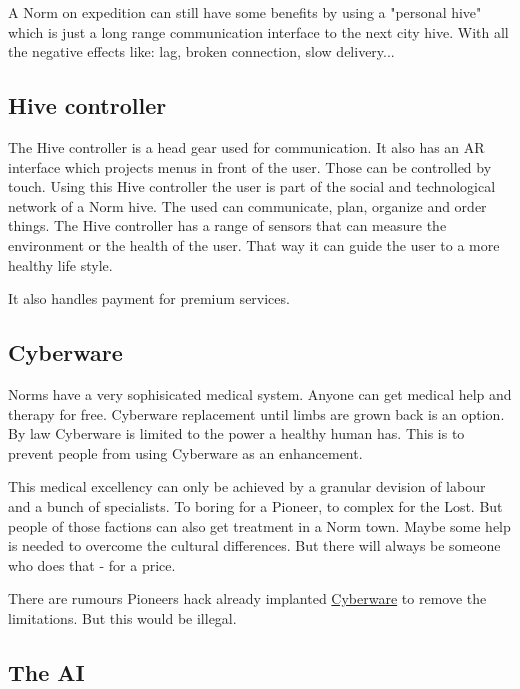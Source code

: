 A Norm on expedition can still have some benefits by using a "personal hive" which is just a long range communication interface to the next city hive. With all the negative effects like: lag, broken connection, slow delivery...

\subsection{Hive controller}
\label{sec:Hive controller}

The Hive controller is a head gear used for communication. It also has an AR interface which projects menus in front of the user. Those can be controlled by touch. Using this Hive controller the user is part of the social and technological network of a Norm hive.
The used can communicate, plan, organize and order things.
The Hive controller has a range of sensors that can measure the environment or the health of the user. That way it can guide the user to a more healthy life style.

It also handles payment for premium services.

\subsection{Cyberware}
\label{sec:Cyberware Norm}

Norms have a very sophisicated medical system. Anyone can get medical help and therapy for free. Cyberware replacement until limbs are grown back is an option.
By law Cyberware is limited to the power a healthy human has. This is to prevent people from using Cyberware as an enhancement.

This medical excellency can only be achieved by a granular devision of labour and a bunch of specialists.
To boring for a Pioneer, to complex for the Lost. But people of those factions can also get treatment in a Norm town. Maybe some help is needed to overcome the cultural differences. But there will always be someone who does that - for a price.

There are rumours Pioneers hack already implanted \hyperref[sec: Cyberware Pioneers]{Cyberware} to remove the limitations. But this would be illegal.



\subsection{The AI}


